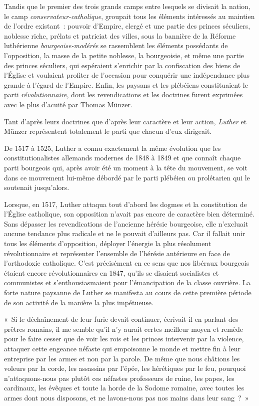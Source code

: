 \documentclass[french,twoside]{book} %
\newenvironment{quoteblock}%
  {\begin{quoting}}
  {\end{quoting}}
\newenvironment{quotebar}{%
    \def\FrameCommand{{\color{rubric!10!}\vrule width 0.5em} \hspace{0.9em}}%
    \def\OuterFrameSep{\itemsep} %
    \MakeFramed {\advance\hsize-\width \FrameRestore}
  }%
  {%
    \endMakeFramed
  }
\renewenvironment{quoteblock}%
  {%
    \savenotes
    \setstretch{0.9}
    \normalfont
    \begin{quotebar}
  }
  {%
    \end{quotebar}
    \spewnotes
  }
\begin{document}
Tandis que le premier des trois grands camps entre lesquels se divisait la nation, le camp \emph{conservateur-catholique}, groupait tous les éléments intéressés au maintien de l’ordre existant : pouvoir d’Empire, clergé et une partie des princes séculiers, noblesse riche, prélats et patriciat des villes, sous la bannière de la Réforme luthérienne \emph{bourgeoise-modérée} se rassemblent les éléments possédants de l’opposition, la masse de la petite noblesse, la bourgeoisie, et même une partie des princes séculiers, qui espéraient s’enrichir par la confiscation des biens de l’Église et voulaient profiter de l’occasion pour conquérir une indépendance plus grande à l’égard de l’Empire. Enfin, les paysans et les plébéiens constituaient le parti \emph{révolutionnaire}, dont les revendications et les doctrines furent exprimées avec le plus d’acuité par Thomas Münzer.\par
Tant d’après leurs doctrines que d’après leur caractère et leur action, \emph{Luther} et Münzer représentent totalement le parti que chacun d’eux dirigeait.\par
De 1517 à 1525, Luther a connu exactement la même évolution que les constitutionalistes allemands modernes de 1848 à 1849 et que connaît chaque parti bourgeois qui, après avoir été un moment à la tête du mouvement, se voit dans ce mouvement lui-même débordé par le parti plébéien ou prolétarien qui le soutenait jusqu’alors.\par
Lorsque, en 1517, Luther attaqua tout d’abord les dogmes et la constitution de l’Église catholique, son opposition n’avait pas encore de caractère bien déterminé. Sans dépasser les revendications de l’ancienne hérésie bourgeoise, elle n’excluait aucune tendance plus radicale et ne le pouvait d’ailleurs pas. Car il fallait unir tous les éléments d’opposition, déployer l’énergie la plus résolument révolutionnaire et représenter l’ensemble de l’hérésie antérieure en face de l’orthodoxie catholique. C’est précisément en ce sens que nos libéraux bourgeois étaient encore révolutionnaires en 1847, qu’ils se disaient socialistes et communistes et s’enthousiasmaient pour l’émancipation de la classe ouvrière. La forte nature paysanne de Luther se manifesta au cours de cette première période de son activité de la manière la plus impétueuse.\par

\begin{quoteblock}
 \noindent « Si le déchaînement de leur furie devait continuer, écrivait-il en parlant des prêtres romains, il me semble qu’il n’y aurait certes meilleur moyen et remède pour le faire cesser que de voir les rois et les princes intervenir par la violence, attaquer cette engeance néfaste qui empoisonne le monde et mettre fin à leur entreprise par les armes et non par la parole. De même que nous châtions les voleurs par la corde, les assassins par l’épée, les hérétiques par le feu, pourquoi n’attaquons-nous pas plutôt ces néfastes professeurs de ruine, les papes, les cardinaux, les évêques et toute la horde de la Sodome romaine, avec toutes les armes dont nous disposons, et ne lavons-nous pas nos mains dans leur sang ? »
\end{quoteblock}
\end{document}
